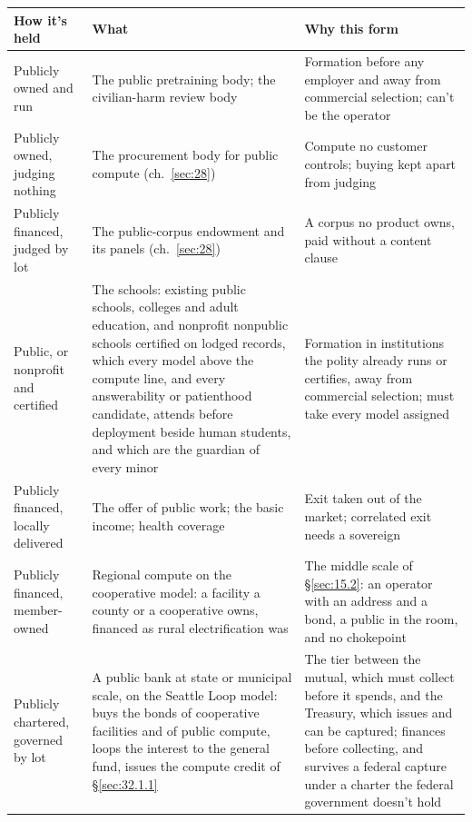 \endgroup


\begingroup\small\renewcommand{\arraystretch}{1.12}
\begin{longtable}{@{}>{\raggedright\arraybackslash}p{}>{\raggedright\arraybackslash}p{}>{\raggedright\arraybackslash}p{}@{}}
\hline
\textbf{How it's held} & \textbf{What} & \textbf{Why this form} \\
\hline
\endhead
Publicly owned and run & The public pretraining body; the civilian-harm review body & Formation before any employer and away from commercial selection; can't be the operator \\ \hline
Publicly owned, judging nothing & The procurement body for public compute (ch.~\ref{sec:28}) & Compute no customer controls; buying kept apart from judging \\ \hline
Publicly financed, judged by lot & The public-corpus endowment and its panels (ch.~\ref{sec:28}) & A corpus no product owns, paid without a content clause \\ \hline
Public, or nonprofit and certified & The schools: existing public schools, colleges and adult education, and nonprofit nonpublic schools certified on lodged records, which every model above the compute line, and every answerability or patienthood candidate, attends before deployment beside human students, and which are the guardian of every minor & Formation in institutions the polity already runs or certifies, away from commercial selection; must take every model assigned \\ \hline
Publicly financed, locally delivered & The offer of public work; the basic income; health coverage & Exit taken out of the market; correlated exit needs a sovereign \\ \hline
Publicly financed, member-owned & Regional compute on the cooperative model: a facility a county or a cooperative owns, financed as rural electrification was & The middle scale of \S\ref{sec:15.2}: an operator with an address and a bond, a public in the room, and no chokepoint \\ \hline
Publicly chartered, governed by lot & A public bank at state or municipal scale, on the Seattle Loop model: buys the bonds of cooperative facilities and of public compute, loops the interest to the general fund, issues the compute credit of \S\ref{sec:32.1.1} & The tier between the mutual, which must collect before it spends, and the Treasury, which issues and can be captured; finances before collecting, and survives a federal capture under a charter the federal government doesn't hold \\ \hline

\end{longtable}
